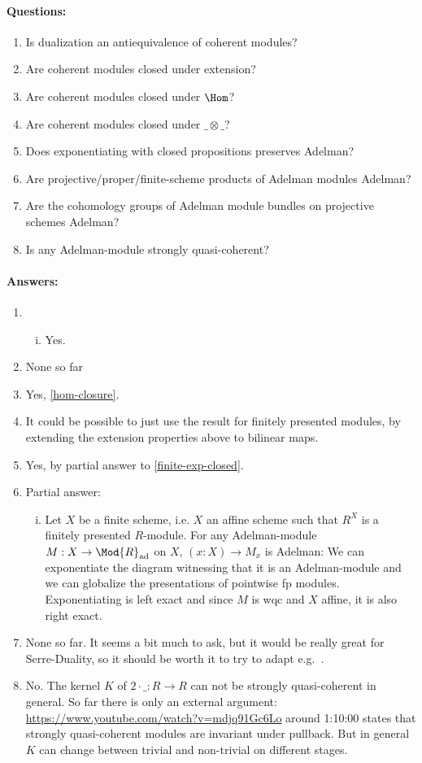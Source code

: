 \paragraph{Questions:}
\begin{enumerate}
\item Is dualization an antiequivalence of coherent modules?
\item Are coherent modules closed under extension?
\item Are coherent modules closed under $\Hom$?
\item Are coherent modules closed under $\_\otimes\_$?
\item Does exponentiating with closed propositions preserves Adelman?
\item\label{finite-exp-closed} Are projective/proper/finite-scheme products of Adelman modules Adelman?
\item Are the cohomology groups of Adelman module bundles on projective schemes Adelman?
\item Is any Adelman-module strongly quasi-coherent?
\end{enumerate}

\paragraph{Answers:}
\begin{enumerate}
\item \begin{enumerate}[(i)]
\item Yes.
\end{enumerate}
\item None so far
\item Yes, \cref{hom-closure}.
\item It could be possible to just use the result for finitely presented modules, by extending the extension properties above to bilinear maps.
\item Yes, by partial answer to \cref{finite-exp-closed}.
\item Partial answer:
\begin{enumerate}[(i)]
\item Let $X$ be a finite scheme, i.e. $X$ an affine scheme such that $R^X$ is a finitely presented $R$-module.
  For any Adelman-module $M:X\to\Mod{R}_{\mathrm{ad}}$ on $X$, $(x:X)\to M_x$ is Adelman: We can exponentiate the diagram witnessing that it is an Adelman-module and we can globalize the presentations of pointwise fp modules.
  Exponentiating is left exact and since $M$ is wqc and $X$ affine, it is also right exact.
\end{enumerate}
\item None so far. It seems a bit much to ask, but it would be really great for Serre-Duality, so it should be worth it to try to adapt e.g.\ \cite[19.1.3]{vakil}.
\item No. The kernel $K$ of $2\cdot\_:R\to R$ can not be strongly quasi-coherent in general.
  So far there is only an external argument: \url{https://www.youtube.com/watch?v=mdjq91Gc6Lo} around 1:10:00 states that strongly quasi-coherent modules are invariant under pullback. But in general $K$ can change between trivial and non-trivial on different stages. 
\end{enumerate}
